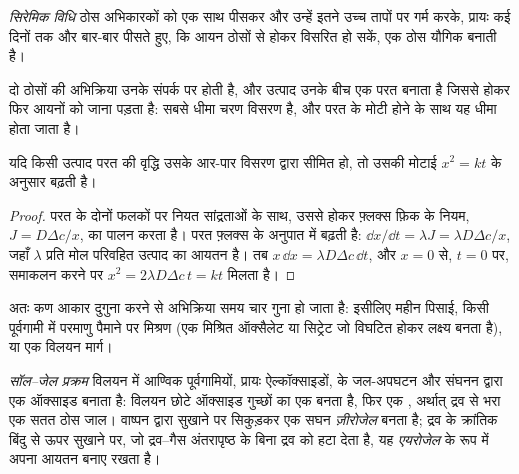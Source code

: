 \begin{definition}[सिरेमिक विधि]\label{def:b3:inorganic-materials:ceramic-method}
\emph{सिरेमिक विधि} ठोस अभिकारकों को एक साथ पीसकर
और उन्हें इतने उच्च तापों पर गर्म करके, प्रायः कई दिनों तक और
बार-बार पीसते हुए, कि आयन ठोसों से होकर विसरित हो सकें, एक ठोस यौगिक
बनाती है।
\end{definition}

दो ठोसों की अभिक्रिया उनके संपर्क पर होती है, और उत्पाद उनके बीच एक
परत बनाता है जिससे होकर फिर आयनों को जाना पड़ता है: सबसे धीमा चरण
विसरण है, और परत के मोटी होने के साथ यह धीमा होता जाता है।

\begin{proposition}[परवलयिक वृद्धि]\label{prop:b3:inorganic-materials:parabolic}
यदि किसी उत्पाद परत की वृद्धि उसके आर-पार विसरण द्वारा सीमित हो, तो उसकी
मोटाई $x^2 = kt$ के अनुसार बढ़ती है।
\end{proposition}

\begin{proof}
परत के दोनों फलकों पर नियत सांद्रताओं के साथ, उससे होकर फ़्लक्स
फ़िक के नियम, $J = D\Delta c/x$, का पालन करता है। परत फ़्लक्स के अनुपात में बढ़ती है:
$\dd x/\dd t = \lambda J = \lambda D\Delta c/x$, जहाँ $\lambda$ प्रति मोल परिवहित उत्पाद का आयतन है। तब
$x\,\dd x = \lambda D\Delta c\,\dd t$, और $x = 0$ से, $t = 0$ पर, समाकलन करने पर $x^2 = 2\lambda D\Delta c\,t = kt$ मिलता है।
\end{proof}

अतः कण आकार दुगुना करने से अभिक्रिया समय चार गुना हो जाता है: इसीलिए
महीन पिसाई, किसी पूर्वगामी में परमाणु पैमाने पर मिश्रण (एक मिश्रित ऑक्सैलेट या
सिट्रेट  जो विघटित होकर लक्ष्य बनता है), या एक विलयन मार्ग।

\begin{definition}[सॉल--जेल प्रक्रम]\label{def:b3:inorganic-materials:sol-gel}
\emph{सॉल--जेल प्रक्रम} विलयन में आण्विक पूर्वगामियों, प्रायः
ऐल्कॉक्साइडों, के जल-अपघटन और संघनन द्वारा एक ऑक्साइड
बनाता है: विलयन छोटे ऑक्साइड गुच्छों का एक  बनता है, फिर एक , अर्थात्
द्रव से भरा एक सतत ठोस जाल। वाष्पन द्वारा सुखाने पर 
सिकुड़कर एक सघन \emph{ज़ीरोजेल} बनता है; द्रव के क्रांतिक
बिंदु से ऊपर सुखाने पर, जो द्रव--गैस अंतरापृष्ठ के बिना द्रव को हटा देता है, यह
\emph{एयरोजेल} के रूप में अपना आयतन बनाए रखता है।
\end{definition}

